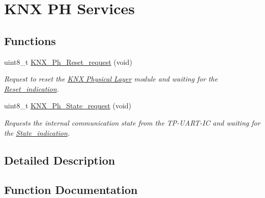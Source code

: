 \hypertarget{group___k_n_x___p_h___sup___exported___functions___group3}{}\section{K\+NX PH Services}
\label{group___k_n_x___p_h___sup___exported___functions___group3}
\subsection*{Functions}
\begin{DoxyCompactItemize}
\item 
uint8\+\_\+t \hyperlink{group___k_n_x___p_h___sup___exported___functions___group3_ga5f33d05301997e2288af4c4e50391548}{K\+N\+X\+\_\+\+Ph\+\_\+\+Reset\+\_\+request} (void)
\begin{DoxyCompactList}\small\item\em Request to reset the \hyperlink{group___k_n_x___p_h}{K\+NX Physical Layer} module and waiting for the \hyperlink{group___u_a_r_t___control___from_gade9c58399a01abdaa03bbecbf63879c3}{Reset\+\_\+indication}. \end{DoxyCompactList}\item 
uint8\+\_\+t \hyperlink{group___k_n_x___p_h___sup___exported___functions___group3_ga54c0cf8cfcfc3366ec286ad92a336be0}{K\+N\+X\+\_\+\+Ph\+\_\+\+State\+\_\+request} (void)
\begin{DoxyCompactList}\small\item\em Requests the internal communication state from the T\+P-\/\+U\+A\+R\+T-\/\+IC and waiting for the \hyperlink{group___u_a_r_t___control___from_ga736e177182335771d7948dd74a7a1a5f}{State\+\_\+indication}. \end{DoxyCompactList}\end{DoxyCompactItemize}


\subsection{Detailed Description}


\subsection{Function Documentation}
